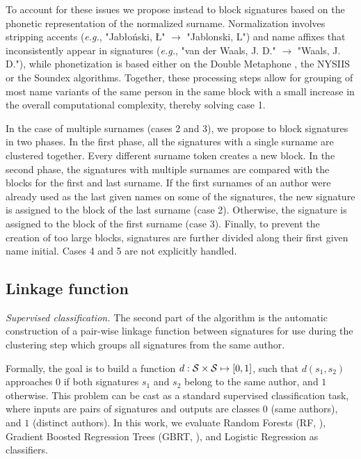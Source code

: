 \documentclass{article}
\newcommand{\eg}{\emph{e.g.}\xspace}
\begin{document}
To account for these issues we propose instead to block signatures based on the
phonetic representation of the normalized surname.
Normalization involves stripping accents (\eg, "Jabłoński, Ł" $\rightarrow$ "Jablonski, L") and name
affixes that inconsistently appear in signatures (\eg, "van der Waals, J. D."
$\rightarrow$ "Waals, J. D."), while phonetization is based either on the
Double Metaphone \citep{doublemetaphone}, the NYSIIS \citep{nysiis} or the
Soundex \citep{Soundex} algorithms.
Together, these processing steps allow for grouping of most name variants of the same
person in the same block with a small increase in the overall computational complexity, thereby solving case 1.

In the case of multiple surnames (cases 2 and 3), we propose to block
signatures in two phases.
In the first phase, all the signatures with a single surname are clustered together.
Every different surname token creates a new block.
In the second phase, the signatures with multiple surnames are compared
with the blocks for the first and last surname.
If the first surnames of an author were already used as the last given names on some of the signatures, the
new signature is assigned to the block of the last surname (case 2).
Otherwise, the signature is assigned to the block of the first surname (case 3).
Finally, to prevent the creation of too large blocks, signatures are further divided
along their first given name initial.
Cases 4 and 5 are not explicitly handled.

\subsection{Linkage function}
\label{methods:linkage}

\textit{Supervised classification.} The second part of the algorithm is the
automatic construction of a pair-wise linkage function between signatures for use
during the clustering step which groups all signatures from the same author.

Formally, the goal is to build a function $d: {\cal S} \times {\cal S} \mapsto
[0, 1]$, such that $d(s_1, s_2)$ approaches $0$ if both signatures $s_1$ and
$s_2$ belong to the same author, and $1$ otherwise.
This problem can be cast as a standard supervised classification task, where inputs
are pairs of signatures and outputs are classes $0$ (same authors), and $1$
(distinct authors). In this work, we evaluate Random Forests (RF, \cite{breiman2001random}),
Gradient Boosted Regression Trees (GBRT, \cite{friedman2001greedy}),
and Logistic Regression \citep{fan2008liblinear} as classifiers.
\end{document}
